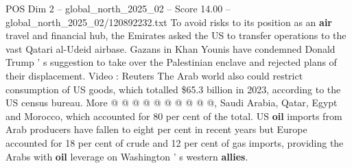 \begin{textsample}{POS Dim 2 – global\_north\_2025\_02 – Score 14.00 – global\_north\_2025\_02/120892232.txt}
To avoid risks to its position as an \textbf{air} travel and financial hub, the Emirates asked the US to transfer operations to the vast Qatari al-Udeid airbase.
Gazans in Khan Younis have condemned Donald Trump ' s suggestion to take over the Palestinian enclave and rejected plans of their displacement.
Video : Reuters The Arab world also could restrict consumption of US goods, which totalled \$65.3 billion in 2023, according to the US census bureau.
More @ @ @ @ @ @ @ @ @ @, Saudi Arabia, Qatar, Egypt and Morocco, which accounted for 80 per cent of the total.
US \textbf{oil} imports from Arab producers have fallen to eight per cent in recent years but Europe accounted for 18 per cent of crude and 12 per cent of gas imports, providing the Arabs with \textbf{oil} leverage on Washington ' s western \textbf{allies}.

\end{textsample}
